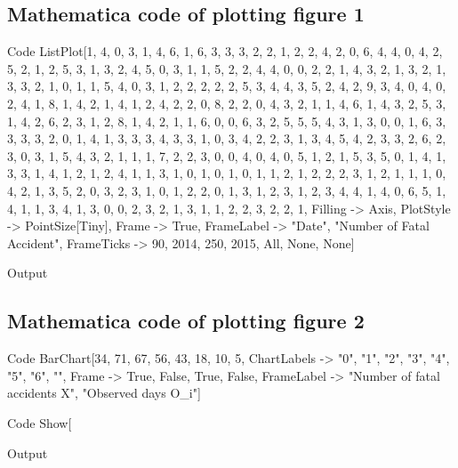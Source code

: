 \documentclass[a4paper,12pt]{article}
\begin{document}
\subsection{Mathematica code of plotting figure 1}
\begin{mmaCell}[functionlocal=y]{Code}
  ListPlot[{1, 4, 0, 3, 1, 4, 6, 1, 6, 3, 3, 3, 2, 2, 1, 
  2, 2, 4, 2, 0, 6, 4, 4, 0, 4, 2, 5, 2, 1, 2, 5, 3, 1, 
  3, 2, 4, 5, 0, 3, 1, 1, 5, 2, 2, 4, 4, 0, 0, 2, 2, 1, 
  4, 3, 2, 1, 3, 2, 1, 3, 3, 2, 1, 0, 1, 1, 5, 4, 0, 3,
  1, 2, 2, 2, 2, 2, 5, 3, 4, 4, 3, 5, 2, 4, 2, 9, 3, 4,
  0, 4, 0, 2, 4, 1, 8, 1, 4, 2, 1, 4, 1, 2, 4, 2, 2, 0,
  8, 2, 2, 0, 4, 3, 2, 1, 1, 4, 6, 1, 4, 3, 2, 5, 3, 1,
  4, 2, 6, 2, 3, 1, 2, 8, 1, 4, 2, 1, 1, 6, 0, 0,
  6, 3, 2, 5, 5, 5, 4, 3, 1, 3, 0, 0, 1, 6, 3, 3, 3,
  3, 2, 0, 1, 4, 1, 3, 3, 3, 4, 3, 3, 1, 0, 3, 4, 2,
  2, 3, 1, 3, 4, 5, 4, 2, 3, 3, 2, 6, 2, 3, 0, 3, 1,
  5, 4, 3, 2, 1, 1, 1, 7, 2, 2, 3, 0, 0, 4, 0, 4, 0,
  5, 1, 2, 1, 5, 3, 5, 0, 1, 4, 1, 3, 3, 1, 4, 1, 2,
  1, 2, 4, 1, 1, 3, 1, 0, 1, 0, 1, 0, 1, 1, 2, 1, 2,
  2, 2, 3, 1, 2, 1, 1, 1, 0, 4, 2, 1, 3, 5, 2, 0, 3, 
  2, 3, 1, 0, 1, 2, 2, 0, 1, 3, 1, 2, 3, 1, 2, 3, 4,
  4, 1, 4, 0, 6, 5, 1, 4, 1, 1, 3, 4, 1, 3, 0, 0,
  2, 3, 2, 1, 3, 1, 1, 2, 2, 3, 2, 2, 1}, 
  Filling -> Axis, PlotStyle -> PointSize[Tiny], 
  Frame -> True,
  FrameLabel -> {"Date", "Number of Fatal Accident"},
  FrameTicks -> {{{90, 2014}, {250, 2015}}, All, None, None}]
\end{mmaCell}
 \begin{mmaCell}[moregraphics={moreig={scale=.7}}]{Output}
 \end{mmaCell}
 
 
\subsection{Mathematica code of plotting figure 2}
\begin{mmaCell}[functionlocal=y]{Code}
   BarChart[{34, 71, 67, 56, 43, 18, 10, 5}, 
   ChartLabels -> {"0", "1", "2", "3", "4", "5", "6", 
   ""},
   Frame -> {{True, False}, {True, False}}, 
   FrameLabel -> {"Number of fatal accidents X", 
   "Observed days O_i"}]
\end{mmaCell}
\begin{mmaCell}[functionlocal=y]{Code}
   Show[%
\end{mmaCell}
 \begin{mmaCell}[moregraphics={moreig={scale=.7}}]{Output}
 \end{mmaCell}
\end{document}
